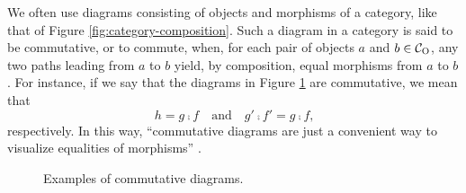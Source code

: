 \begin{definition}



  \label{def:commutative-diagram}


  We often use diagrams consisting of objects and morphisms of a
  category, like that of Figure \ref{fig:category-composition}. Such a
  diagram in a category  is said to be commutative, or to
  commute, when, for each pair of objects $a$ and $b \in \mathcal{C}_{\operatorname{O}}$,
  any two paths leading from $a$ to $b$ yield, by composition, equal
  morphisms from $a$ to $b$. For instance, if we say that the diagrams
  in Figure \ref{fig:commutative-diagram} are commutative, we mean
  that
  \begin{equation*}
    h = g \comp f
    \quad
    \text{and}
    \quad
    g' \comp f' = g \comp f
    \text{,}
  \end{equation*}
  respectively. In this way, ``commutative diagrams are just a
  convenient way to visualize equalities of morphisms''
  \parencite[434]{poigne-1992}.

  \begin{figure}[htbp]
    \begin{subfigure}{0.5\linewidth}
      \begin{center}
      \end{center}
    \end{subfigure}
    \begin{subfigure}{0.5\linewidth}
      \begin{center}
      \end{center}
    \end{subfigure}
    \caption{Examples of commutative diagrams.}
    \label{fig:commutative-diagram}
  \end{figure}

\end{definition}


